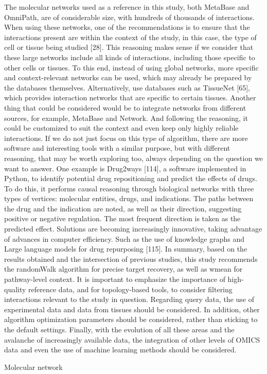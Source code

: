 The molecular networks used as a reference in this study, both MetaBase and OmniPath, are of considerable size, with hundreds of thousands of interactions. When using these networks, one of the recommendations is to ensure that the interactions present are within the context of the study, in this case, the type of cell or tissue being studied [28]. This reasoning makes sense if we consider that these large networks include all kinds of interactions, including those specific to other cells or tissues. To this end, instead of using global networks, more specific and context-relevant networks can be used, which may already be prepared by the databases themselves. Alternatively, use databases such as TissueNet [65], which provides interaction networks that are specific to certain tissues. Another thing that could be considered would be to integrate networks from different sources, for example, MetaBase and Network. And following the reasoning, it could be customized to suit the context and even keep only highly reliable interactions. 
If we do not just focus on this type of algorithm, there are more software and interesting tools with a similar purpose, but with different reasoning, that may be worth exploring too, always depending on the question we want to answer. One example is Drug2ways [114], a software implemented in Python, to identify potential drug repositioning and predict the effects of drugs. To do this, it performs causal reasoning through biological networks with three types of vertices: molecular entities, drugs, and indications. The paths between the drug and the indication are noted, as well as their direction, suggesting positive or negative regulation. The most frequent direction is taken as the predicted effect. Solutions are becoming increasingly innovative, taking advantage of advances in computer efficiency. Such as the use of knowledge graphs and Large language models for drug repurposing [115]. 
In summary, based on the results obtained and the intersection of previous studies, this study recommends the randomWalk algorithm for precise target recovery, as well as wmean for pathway-level context. It is important to emphasize the importance of high-quality reference data, and for topology-based tools, to consider filtering interactions relevant to the study in question. Regarding query data, the use of experimental data and data from tissues should be considered. In addition, other algorithm optimization parameters should be considered, rather than sticking to the default settings. Finally, with the evolution of all these areas and the avalanche of increasingly available data, the integration of other levels of OMICS data and even the use of machine learning methods should be considered.


\gls{Molecular network}
